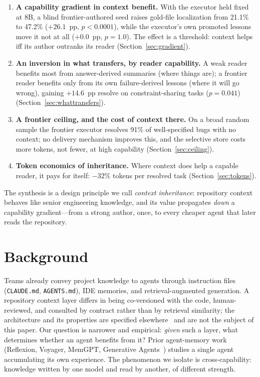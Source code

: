\documentclass[sigconf,nonacm]{acmart}
\begin{document}
\begin{enumerate}
\item \textbf{A capability gradient in context benefit.} With the executor held
fixed at 8B, a blind frontier-authored seed raises gold-file localization from
21.1\% to 47.2\% ($+26.1$~pp, $p<0.0001$), while the executor's own promoted
lessons move it not at all ($+0.0$~pp, $p=1.0$). The effect is a threshold:
context helps iff its author outranks its reader (Section~\ref{sec:gradient}).
\item \textbf{An inversion in what transfers, by reader capability.} A weak
reader benefits most from answer-derived summaries (where things are); a frontier
reader benefits only from its own failure-derived lessons (where it will go
wrong), gaining $+14.6$~pp resolve on constraint-sharing tasks ($p=0.041$)
(Section~\ref{sec:whattransfers}).
\item \textbf{A frontier ceiling, and the cost of context there.} On a broad
random sample the frontier executor resolves 91\% of well-specified bugs with no
context; no delivery mechanism improves this, and the selective store costs more
tokens, not fewer, at high capability (Section~\ref{sec:ceiling}).
\item \textbf{Token economics of inheritance.} Where context does help a capable
reader, it pays for itself: $-32\%$ tokens per resolved task
(Section~\ref{sec:tokens}).
\end{enumerate}

The synthesis is a design principle we call \emph{context inheritance}:
repository context behaves like senior engineering knowledge, and its value
propagates \emph{down} a capability gradient---from a strong author, once, to
every cheaper agent that later reads the repository.

\section{Background}
Teams already convey project knowledge to agents through instruction files
(\texttt{CLAUDE.md}, \texttt{AGENTS.md}), IDE memories, and
retrieval-augmented generation. A repository context layer differs in being
co-versioned with the code, human-reviewed, and consulted by contract rather
than by retrieval similarity; the architecture and its properties are specified
elsewhere~\cite{manifesto,rcl} and are not the subject of this paper. Our
question is narrower and empirical: \emph{given} such a layer, what determines
whether an agent benefits from it? Prior agent-memory work (Reflexion,
Voyager, MemGPT, Generative Agents~\cite{reflexion,voyager,memgpt,genagents})
studies a single agent accumulating its own experience. The phenomenon we isolate
is cross-capability: knowledge written by one model and read by another, of
different strength.
\end{document}
